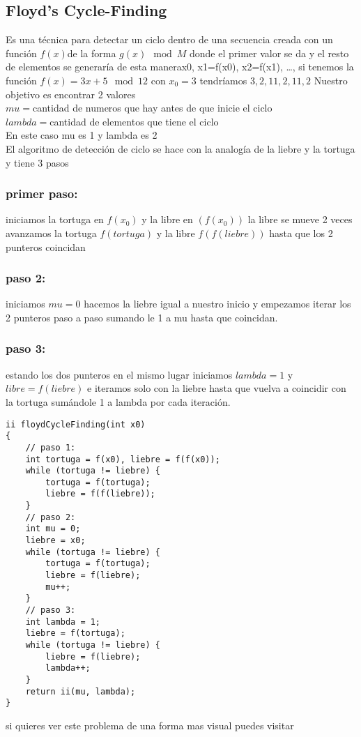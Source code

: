 \subsection{Floyd’s Cycle-Finding}
Es una técnica para detectar un ciclo dentro de una secuencia creada con un función $f(x)$de la forma $g(x) \mod{M}$
donde el primer valor se da y el resto de elementos  se generaría de esta manera{x0, x1=f(x0), x2=f(x1),  …},
si tenemos la función $f(x)=3x+5 \mod{12}$ con $x_0=3$ tendríamos ${3, 2,11,2,11,2}$ Nuestro objetivo es encontrar 2 valores
\\$mu = $cantidad de numeros que hay antes de que inicie el ciclo
\\$lambda = $cantidad de elementos que tiene el ciclo
\\En este caso mu es 1 y lambda es 2
\\El algoritmo de detección de ciclo se hace con la analogía de la liebre y la tortuga y tiene 3 pasos
\subsubsection{primer paso:}
iniciamos la  tortuga en $f(x_0)$ y la libre en $(f(x_0))$ la libre se mueve 2 veces avanzamos la tortuga $f(tortuga)$ y la libre $f(f(liebre))$ hasta que los 2 punteros coincidan
\subsubsection{paso 2:}
iniciamos $mu=0$ hacemos la liebre igual a nuestro inicio y empezamos iterar los 2 punteros paso a paso sumando le 1 a mu hasta que coincidan.
\subsubsection{paso 3:}
estando los dos punteros en el mismo lugar iniciamos $lambda=1$ y $libre=f(liebre)$
e iteramos solo con la liebre hasta que vuelva a coincidir con la tortuga sumándole 1 a lambda por cada iteración.
\begin{minipage}{\textwidth}
\begin{lstlisting}[style=C,caption=floydCycleFinding.cpp]
ii floydCycleFinding(int x0)
{
    // paso 1:
    int tortuga = f(x0), liebre = f(f(x0));
    while (tortuga != liebre) {
        tortuga = f(tortuga);
        liebre = f(f(liebre));
    }
    // paso 2:
    int mu = 0;
    liebre = x0;
    while (tortuga != liebre) {
        tortuga = f(tortuga);
        liebre = f(liebre);
        mu++;
    }
    // paso 3:
    int lambda = 1;
    liebre = f(tortuga);
    while (tortuga != liebre) {
        liebre = f(liebre);
        lambda++;
    }
    return ii(mu, lambda);
}
\end{lstlisting}
\end{minipage}

si quieres ver este problema de una forma mas visual puedes visitar \cite{Visualgo:Online} 
